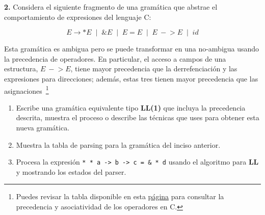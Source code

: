 \textbf{2.} Considera el siguiente fragmento de una gram\'atica que abstrae el 
comportamiento de expresiones del lenguaje \textsf{C}:

\[
E \to *E \;\mid\; \&E \;\mid\; E = E \;\mid\; E\ -\!> E \;\mid\; id
\]

Esta gram\'atica es ambigua pero se puede transformar en una no-ambigua usando
la precedencia de operadores.
En particular, el acceso a campos de una estructura, $E\ -\!> E$, tiene mayor 
precedencia que la derrefenciaci\'on y las expresiones para direcciones; 
adem\'as, estas tres tienen mayor precedencia que las 
asignaciones~\footnote{Puedes revisar la tabla disponible en esta 
\href{https://justdocodings.blogspot.com/2018/06/operator-precedence-and-associativity.html}{p\'agina} 
para consultar la precedencia y asociatividad de los operadores en \textsc{C}.}
\begin{enumerate}
\item Escribe una gram\'atica equivalente tipo \textbf{LL(1)} que incluya la
precedencia descrita, muestra el proceso o describe las técnicas que uses para 
obtener esta nueva gramática.
\item Muestra la tabla de parsing para la gram\'atica del inciso anterior.
\item Procesa la expresi\'on
\verb!* * a -> b -> c = & * d!  usando el algoritmo para \textbf{LL} y 
mostrando los estados del parser. 
\end{enumerate}

